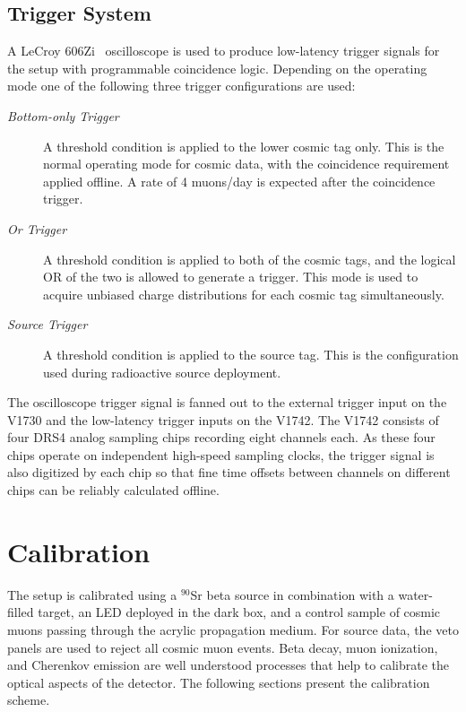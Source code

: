 \subsection{Trigger System}
\label{sec:triggering}

A LeCroy 606Zi~\cite{lecroy606zi} oscilloscope is used to produce low-latency trigger signals for the setup with programmable coincidence logic. 
Depending on the operating mode one of the following three trigger configurations are used:
\begin{description}
\item [\textrm{\textit{Bottom-only Trigger}}] A threshold condition is applied to the lower cosmic tag only. 
This is the normal operating mode for cosmic data, with the coincidence requirement applied offline.  
A rate of 4 muons/day is expected after the coincidence trigger.
\item [\textrm{\textit{Or Trigger}}] A threshold condition is applied to both of the cosmic tags, and the logical OR of the two is allowed to generate a trigger. 
This mode is used to acquire unbiased charge distributions for each cosmic tag simultaneously.
\item [\textrm{\textit{Source Trigger}}] A threshold condition is applied to the source tag. 
This is the configuration used during radioactive source deployment.
\end{description}
The oscilloscope trigger signal is fanned out to the external trigger input on the V1730 and the low-latency trigger inputs on the V1742.
The V1742 consists of four DRS4 analog sampling chips recording eight channels each.
As these four chips operate on independent high-speed sampling clocks, the trigger signal is also digitized by each chip so that fine time offsets between channels on different chips can be reliably calculated offline.  

\section{Calibration}
\label{sec:calibration}

The setup is calibrated using a $^{90}$Sr beta source in combination with a water-filled target, an LED deployed in the dark box, and a control sample of cosmic muons passing through the acrylic propagation medium. 
For source data, the veto panels are used to reject all cosmic muon events. 
Beta decay, muon ionization, and Cherenkov emission are well understood processes that help to calibrate the optical aspects of the detector. 
The following sections present the calibration scheme.

